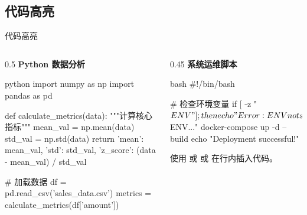 \subsection{代码高亮}
\begin{frame}[fragile]{代码高亮}
    \begin{columns}[T]
        \begin{column}{0.5\textwidth}
            \textbf{\color{main} Python 数据分析}
            \begin{iCodeEnv}{}{python}
import numpy as np
import pandas as pd

def calculate_metrics(data):
    """计算核心指标"""
    mean_val = np.mean(data)
    std_val = np.std(data)
    return {
        'mean': mean_val,
        'std': std_val,
        'z_score': (data - mean_val) / std_val
    }

# 加载数据
df = pd.read_csv('sales_data.csv')
metrics = calculate_metrics(df['amount'])
            \end{iCodeEnv}
        \end{column}
        \begin{column}{0.45\textwidth}
            \textbf{\color{main} 系统运维脚本}
            \begin{iCodeEnv}{}{bash}
#!/bin/bash

# 检查环境变量
if [ -z "$ENV" ]; then
    echo "Error: ENV not set"
    exit 1
fi

echo "Deploying to $ENV..."
docker-compose up -d --build
echo "Deployment successful!"
            \end{iCodeEnv}
            \vspace{0.5em}
            \small
            使用  或  或  在行内插入代码。
        \end{column}
    \end{columns}
\end{frame}

